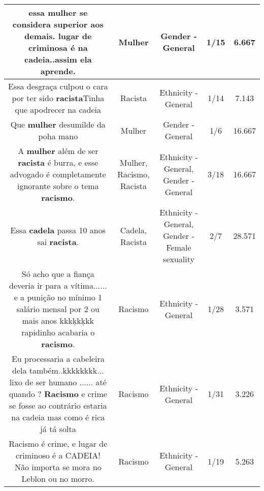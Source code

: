 \documentclass[11pt]{article}
\newlength\mylength
\begin{document}
\begin{center}
\begin{longtable}{|C{.65\mylength}|C{.30\mylength}|C{.12\mylength}|C{.12\mylength}|C{.12\mylength}|}
  \small essa \textbf{mulher} se considera superior aos demais. lugar de criminosa é na cadeia..assim ela aprende.\normalsize   & Mulher & Gender - General & 1/15 & 6.667 \\  \hline
  \small Essa desgraça culpou o cara por ter sido \textbf{racista}Tinha que apodrecer na cadeia\normalsize   & Racista & Ethnicity - General & 1/14 & 7.143 \\  \hline
  \small Que \textbf{mulher} desumilde da poha mano\normalsize   & Mulher & Gender - General & 1/6 & 16.667 \\  \hline
  \small A \textbf{mulher} além de ser \textbf{racista} é burra, e esse advogado é completamente ignorante sobre o tema \textbf{racismo}.\normalsize   & Mulher, Racismo, Racista & Ethnicity - General, Gender - General & 3/18 & 16.667 \\  \hline
  \small Essa \textbf{cadela} passa 10 anos sai \textbf{racista}.\normalsize   & Cadela, Racista & Ethnicity - General, Gender - Female sexuality & 2/7 & 28.571 \\  \hline
  \small Só acho que a  fiança deveria ir para a vítima...... e a punição no mínimo 1 salário mensal por 2 ou mais anos kkkķkķkk rapidinho acabaria o \textbf{racismo}.\normalsize   & Racismo & Ethnicity - General & 1/28 & 3.571 \\  \hline
  \small Eu processaria a cabeleira dela também..kkkkkkkk... lixo de ser humano ...... até quando ? \textbf{Racismo} e crime se fosse ao contrário estaria na cadeia mas como é rica já tá solta\normalsize   & Racismo & Ethnicity - General & 1/31 & 3.226 \\  \hline
  \small Racismo é crime, e lugar de criminoso é a CADEIA! Não importa se mora no Leblon ou no morro.\normalsize   & Racismo & Ethnicity - General & 1/19 & 5.263 \\  \hline

\end{longtable}
\end{center}
\end{document}
